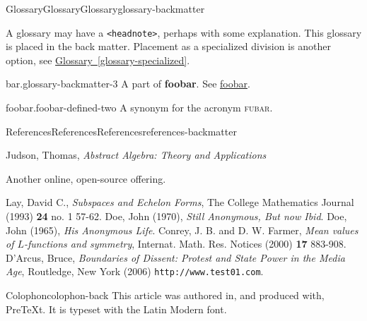 \documentclass[twoside,10pt,]{article}
\newcommand{\xreffont}{\relax}
\newcommand{\mono}[1]{\texttt{#1}}
\newcommand{\acronym}[1]{\textsc{\MakeLowercase{#1}}}
\newcommand{\terminology}[1]{\textbf{#1}}
\numberwithin{equation}{section}
\begin{document}
\begin{glossary-section-numberless}{Glossary}{Glossary}{}{Glossary}{}{}{glossary-backmatter}
%
\begin{introduction}{}%
A glossary may have a \mono{<headnote>}, perhaps with some explanation.  This glossary is placed in the back matter.  Placement as a specialized division is another option, see \hyperref[glossary-specialized]{Glossary~{\xreffont\ref{glossary-specialized}}}.%
\end{introduction}%
\begin{glossaryitem}{bar.}{glossary-backmatter-3}
A part of \terminology{foobar}.  See \hyperref[foobar-defined-two]{foobar}.%
\end{glossaryitem}
\begin{glossaryitem}{foobar.}{foobar-defined-two}
A synonym for the acronym \acronym{FUBAR}.%
\end{glossaryitem}
\end{glossary-section-numberless}
%
%
\typeout{************************************************}
\typeout{************************************************}
%
\begin{references-section-numberless}{References}{References}{}{References}{}{}{references-backmatter}
\begin{referencelist}
\hypertarget{biblio-judson-aata}{}Judson, Thomas, \textit{Abstract Algebra: Theory and Applications}\par%
Another online, open-source offering.%

\hypertarget{biblio-lay-article}{}Lay, David C., \textit{Subspaces and Echelon Forms}, The College Mathematics Journal (1993) \textbf{24} no. 1 57-62.
\hypertarget{citeproc-py-item-3-later}{}Doe, John (1970), \textit{Still Anonymous, But now Ibid}.
\hypertarget{citeproc-py-item-3}{}Doe, John (1965), \textit{His Anonymous Life}.
\hypertarget{conrey-farmer}{}Conrey, J. B. and D. W. Farmer, \textit{Mean values of \(L\)-functions and symmetry}, Internat. Math. Res. Notices (2000) \textbf{17} 883-908.
\hypertarget{citeproc-py-item-5}{}D'Arcus, Bruce, \textit{Boundaries of Dissent: Protest and State Power in the Media Age}, Routledge, New York (2006) \mono{http:\slash{}\slash{}www.test01.com}.
\end{referencelist}
\end{references-section-numberless}
%
{\xreffont\printindex}
%
\begin{backcolophon}{Colophon}{colophon-back}%
This article was authored in, and produced with, PreTeXt.  It is typeset with the Latin Modern font.%
\end{backcolophon}%
\end{document}

